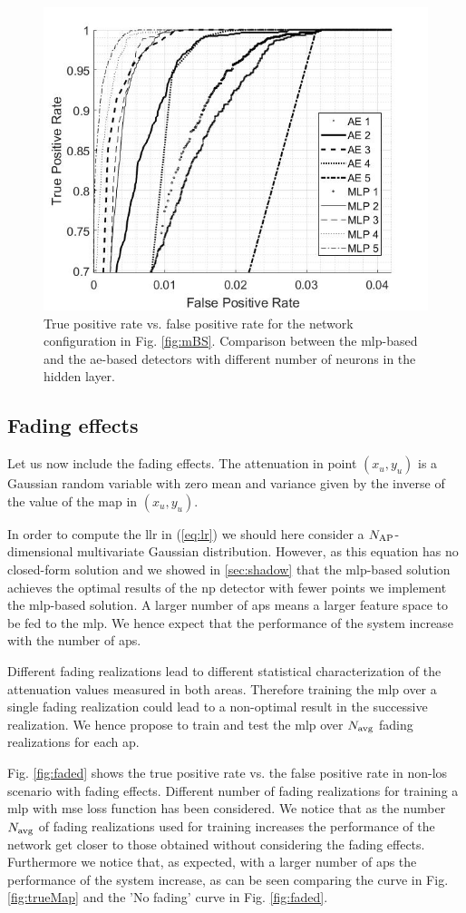 \documentclass[draftcls,onecolumn,12pt]{IEEEtran}
\begin{document}
\begin{figure}
    \centering
    \includegraphics[width=0.5\columnwidth]{RNNvsMLPnNeur.jpg}
    \caption{True positive rate vs. false positive rate for the network configuration in Fig. \ref{fig:mBS}. Comparison between the \ac{mlp}-based and the \ac{ae}-based detectors with different number of neurons in the hidden layer.}
    \label{fig:rnnMLP}
\end{figure}


\subsection{Fading effects}\label{sec:res_fading}
Let us now include the fading effects. The attenuation in point $(x_u,y_u)$ is a Gaussian random variable with zero mean and variance given by the inverse of the value of the map in $(x_u,y_u)$.


In order to compute the \ac{llr} in (\ref{eq:lr}) we should here consider a $N_{\rm AP}$-dimensional multivariate Gaussian distribution. However, as this equation has no closed-form solution and we showed in \ref{sec:shadow} that the \ac{mlp}-based solution achieves the optimal results of the \ac{np} detector with fewer points we implement the \ac{mlp}-based solution. A larger number of \acp{ap} means a larger feature space to be fed to the \ac{mlp}. We hence expect that the performance of the system increase with the number of \acp{ap}.

Different fading realizations lead to different statistical characterization of the attenuation values measured in both areas. Therefore training the \ac{mlp} over a single fading realization could lead to a non-optimal result in the successive realization. We hence propose to train and test the \ac{mlp} over $N_{\rm avg}$ fading realizations for each \ac{ap}.

Fig. \ref{fig:faded} shows the true positive rate vs. the false positive rate in non-\ac{los} scenario with fading effects. Different number of fading realizations for training a \ac{mlp} with \ac{mse} loss function has been considered. We notice that as the number $N_{\rm avg}$ of fading realizations used for training increases the performance of the network get closer to those obtained without considering the fading effects. Furthermore we notice that, as expected, with a larger number of \acp{ap} the performance of the system increase, as can be seen comparing the curve in Fig. \ref{fig:trueMap} and the 'No fading' curve in Fig. \ref{fig:faded}.
\end{document}
